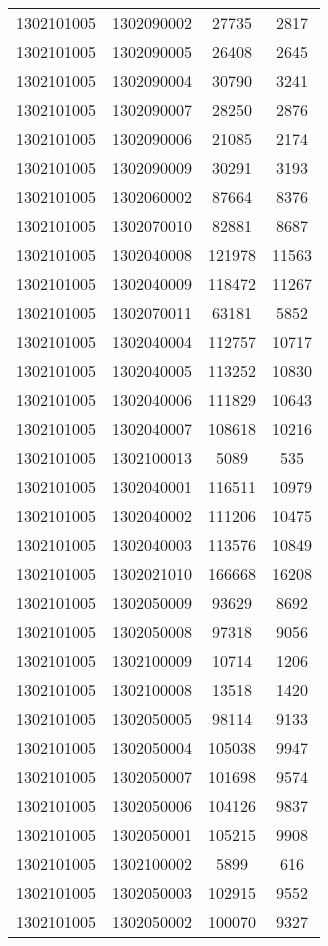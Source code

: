 \begin{longtable}{llcc}
1302101005 & 1302090002 & 27735 & 2817\\
1302101005 & 1302090005 & 26408 & 2645\\
1302101005 & 1302090004 & 30790 & 3241\\
1302101005 & 1302090007 & 28250 & 2876\\
1302101005 & 1302090006 & 21085 & 2174\\
1302101005 & 1302090009 & 30291 & 3193\\
1302101005 & 1302060002 & 87664 & 8376\\
1302101005 & 1302070010 & 82881 & 8687\\
1302101005 & 1302040008 & 121978 & 11563\\
1302101005 & 1302040009 & 118472 & 11267\\
1302101005 & 1302070011 & 63181 & 5852\\
1302101005 & 1302040004 & 112757 & 10717\\
1302101005 & 1302040005 & 113252 & 10830\\
1302101005 & 1302040006 & 111829 & 10643\\
1302101005 & 1302040007 & 108618 & 10216\\
1302101005 & 1302100013 & 5089 & 535\\
1302101005 & 1302040001 & 116511 & 10979\\
1302101005 & 1302040002 & 111206 & 10475\\
1302101005 & 1302040003 & 113576 & 10849\\
1302101005 & 1302021010 & 166668 & 16208\\
1302101005 & 1302050009 & 93629 & 8692\\
1302101005 & 1302050008 & 97318 & 9056\\
1302101005 & 1302100009 & 10714 & 1206\\
1302101005 & 1302100008 & 13518 & 1420\\
1302101005 & 1302050005 & 98114 & 9133\\
1302101005 & 1302050004 & 105038 & 9947\\
1302101005 & 1302050007 & 101698 & 9574\\
1302101005 & 1302050006 & 104126 & 9837\\
1302101005 & 1302050001 & 105215 & 9908\\
1302101005 & 1302100002 & 5899 & 616\\
1302101005 & 1302050003 & 102915 & 9552\\
1302101005 & 1302050002 & 100070 & 9327\\

\end{longtable}
